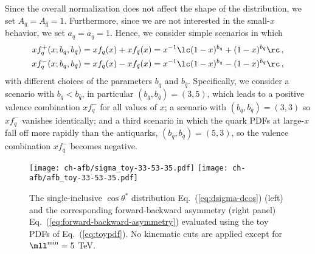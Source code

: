 Since the overall normalization does not affect the shape
of the distribution, we set $A_q=A_{\bar{q}}=1$.
%
Furthermore, since we are not interested in the small-$x$ behavior,
we set $a_q=a_{\bar{q}}=1$. 
%
Hence, we consider simple scenarios in which 
\begin{align}\label{eq:toyp}
xf_q^+(x; b_q,b_{\bar{q}}) &= xf_q(x)+xf_{\bar{q}}(x) = x^{-1}\lc (1-x)^{b_q} +(1-x)^{b_{\bar{q}}}  \rc  \,, \\\label{eq:toym}
xf_q^-(x; b_q,b_{\bar{q}}) &= xf_q(x)-xf_{\bar{q}}(x) = x^{-1}\lc (1-x)^{b_q} -(1-x)^{b_{\bar{q}}}  \rc  \,, 
\end{align}
with different choices of the parameters  $b_q$ and $b_{\bar{q}}$.
Specifically, we consider a scenario with $b_q < b_{\bar{q}} $, in particular
$(b_q,b_{\bar{q}})=(3,5)$, which leads to a positive valence combination $xf_q^-$
for all values of $x$;  a  scenario with
$(b_q,b_{\bar{q}})=(3,3)$ so  $xf_q^-$ vanishes identically; and a third scenario
in which the quark PDFs at large-$x$ fall off more rapidly than the antiquarks,
$(b_q,b_{\bar{q}})=(5,3)$, so the valence combination $xf_q^-$ becomes negative.

\begin{figure}[!t]
 \centering
 \texttt{[image: ch-afb/sigma\_toy-33-53-35.pdf]}
 \texttt{[image: ch-afb/afb\_toy-33-53-35.pdf]}
 \caption{The single-inclusive $\cos\theta^*$ distribution
   Eq.~(\ref{eq:dsigma-dcos})  (left)
   and the corresponding forward-backward asymmetry
   (right panel) Eq.~(\ref{eq:forward-backward-asymmetry}) evaluated using 
    the toy PDFs of Eq.~(\ref{eq:toypdf}).
   No  kinematic cuts are applied except for $\mll^{\rm min}=5$ TeV.
 }    
 \label{fig:sigma_toy}
\end{figure}

